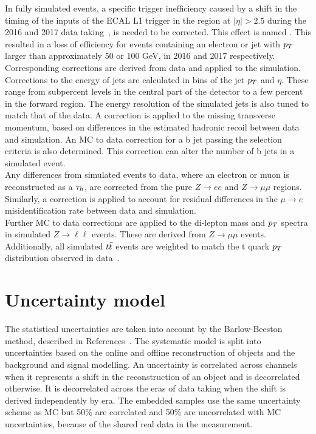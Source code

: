 In fully simulated events, a specific trigger inefficiency caused by a shift in the timing of the inputs of the \ac{ECAL} L1 trigger in the region at $|\eta|>2.5$ during the 2016 and 2017 data taking~\cite{CMS:2020cmk}, is needed to be corrected.
This effect is named .
This resulted in a loss of efficiency for events containing an electron or jet with $p_{T}$ larger than approximately 50 or 100 GeV, in 2016 and 2017 respectively. 
Corresponding corrections are derived from data and applied to the simulation. \\

Corrections to the energy of jets are calculated in bins of the jet $p_{T}$ and $\eta$.
These range from subpercent levels in the central part of the detector to a few percent in the forward region. 
The energy resolution of the simulated jets is also tuned to match that of the data. 
A correction is applied to the missing transverse momentum, based on differences in the estimated hadronic recoil between data and simulation. 
An \ac{MC} to data correction for a b jet passing the selection criteria is also determined. 
This correction can alter the number of b jets in a simulated event. \\

Any differences from simulated events to data, where an electron or muon is reconstructed as a $\tau_{h}$, are corrected from the pure $Z\rightarrow ee$ and $Z\rightarrow\mu\mu$ regions. 
Similarly, a correction is applied to account for residual differences in the $\mu\rightarrow e$ misidentification rate between data and simulation. \\

Further \ac{MC} to data corrections are applied to the di-lepton mass and $p_{T}$ spectra in simulated $Z\rightarrow \ell\ell$ events. 
These are derived from $Z\rightarrow\mu\mu$ events.
Additionally, all simulated $t\bar{t}$ events are weighted to match the t quark $p_{T}$ distribution observed in data~\cite{CMS:2015rld}.

\section{Uncertainty model}
\label{sec:uncerts}

The statistical uncertainties are taken into account by the Barlow-Beeston method, described in References~\cite{Barlow:1993dm,Conway:2011in}.
The systematic model is split into uncertainties based on the online and offline reconstruction of objects and the background and signal modelling.
An uncertainty is correlated across channels when it represents a shift in the reconstruction of an object and is decorrelated otherwise.
It is decorrelated across the eras of data taking when the shift is derived independently by era.
The embedded samples use the same uncertainty scheme as \ac{MC} but 50\% are correlated and 50\% are uncorrelated with \ac{MC} uncertainties, because of the shared real data in the measurement.

